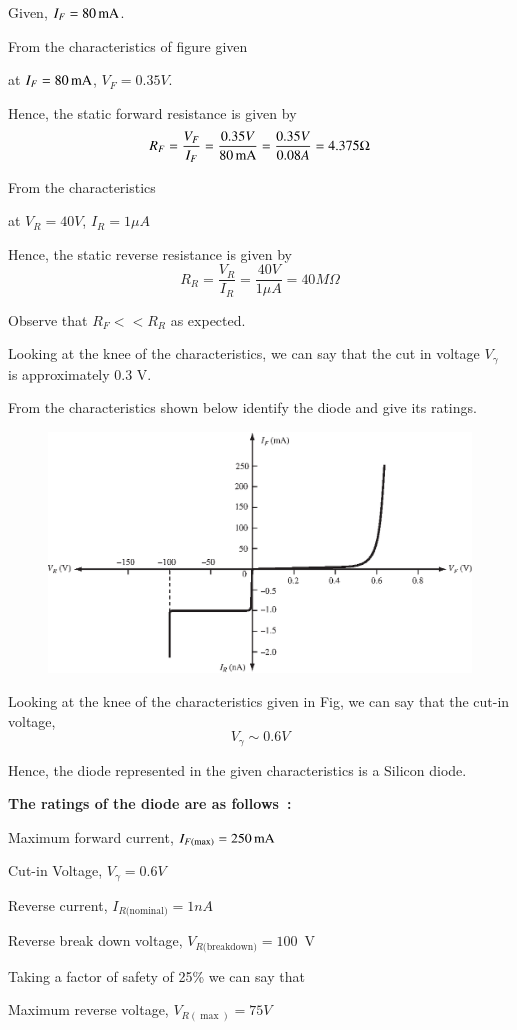 \begin{solution}
Given, $I_F =80 \operatorname{mA}$.

From the characteristics of figure given

at $I_F = 80 \operatorname{mA}$, $V_F = 0.35 V$.

Hence, the static forward resistance is given by 
$$
R_F = \frac{V_F}{I_F} = \frac{0.35 V}{80 \operatorname{mA}} = \frac{0.35 V}{0.08 A} =
4.375 \Omega
$$

From the characteristics

at $V_R = 40 V$, $I_R =1 \mu A$

Hence, the static reverse resistance is given by 
$$
R_R = \frac{V_R}{I_R} = \frac{40 V}{1 \mu A} = 40 M \Omega
$$

Observe that $R_F < < R_R$ as expected. 

Looking at the knee of the characteristics, we can say that the cut in
voltage $V_\gamma$ is approximately 0.3 V.
\end{solution}

\begin{example}\label{exam1.4}
From the characteristics shown below identify the diode and
  give its ratings.
\begin{figure}[H]
\centering
\includegraphics{chap1/S3-EE-01-011.eps}
\end{figure}
\end{example}

\begin{solution}
Looking at the knee of the characteristics given in Fig, we can say
that the cut-in voltage, 
$$
V_\gamma \sim 0.6 V
$$

Hence, the diode represented in the given characteristics is a Silicon
diode.

{\bf The ratings of the diode are as follows~:}

Maximum forward current, $I_{F(\max)} = 250 \operatorname{mA}$

Cut-in Voltage, $V_\gamma = 0.6 V$

Reverse current, $I_{R\text{(nominal)}} = 1 nA$

Reverse break down voltage, $V_{R\text{(breakdown)}} = 100$~V

Taking a factor of safety of 25\% we can say that 

Maximum reverse voltage, $V_{R(\max)} = 75 V$ 
\end{solution}

